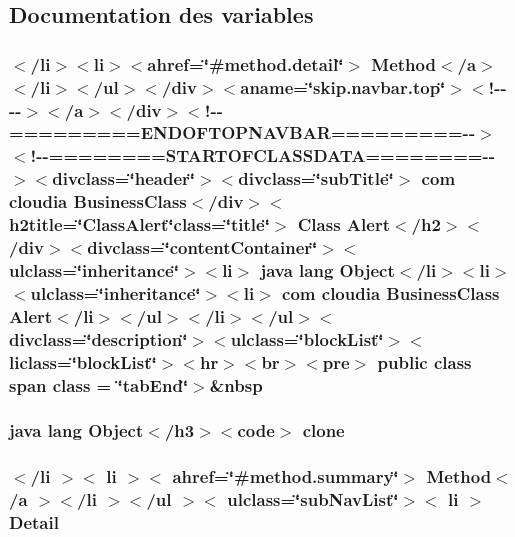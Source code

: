 \subsection{Documentation des variables}
\hypertarget{_alert_8html_a290c972cb9a60e397e66d2e329e3e475}{
\subsubsection[{class}]{\setlength{\rightskip}{0pt plus 5cm}$<$/li$>$$<$li$>$$<$ahref=\char`\"{}\#method.\-detail\char`\"{}$>$ Method$<$/{\bf a}$>$$<$/li$>$$<$/ul$>$$<$/div$>$$<$aname=\char`\"{}skip.\-navbar.\-top\char`\"{}$>$$<$!-\/-\/-\/-\/$>$$<$/a$>$$<$/div$>$$<$!-\/-\/=========E\-N\-D\-O\-F\-T\-O\-P\-N\-A\-V\-B\-A\-R=========-\/-\/$>$$<$!-\/-\/========S\-T\-A\-R\-T\-O\-F\-C\-L\-A\-S\-S\-D\-A\-T\-A========-\/-\/$>$$<$divclass=\char`\"{}header\char`\"{}$>$$<$divclass=\char`\"{}sub\-Title\char`\"{}$>$ com cloudia Business\-Class$<$/div$>$$<$h2title=\char`\"{}Class\-Alert\char`\"{}class=\char`\"{}title\char`\"{}$>$ Class {\bf Alert}$<$/h2$>$$<$/div$>$$<$divclass=\char`\"{}content\-Container\char`\"{}$>$$<$ulclass=\char`\"{}inheritance\char`\"{}$>$$<$li$>$ java lang Object$<$/li$>$$<$li$>$$<$ulclass=\char`\"{}inheritance\char`\"{}$>$$<$li$>$ com cloudia Business\-Class {\bf Alert}$<$/li$>$$<$/ul$>$$<$/li$>$$<$/ul$>$$<$divclass=\char`\"{}description\char`\"{}$>$$<$ulclass=\char`\"{}block\-List\char`\"{}$>$$<$liclass=\char`\"{}block\-List\char`\"{}$>$$<$hr$>$$<$br$>$$<$pre$>$ public class {\bf span} class = \char`\"{}tab\-End\char`\"{}$>$\&nbsp}}\label{_alert_8html_a290c972cb9a60e397e66d2e329e3e475}
\hypertarget{_alert_8html_adc9607fcabf6f2d7f401ad52015ef6e0}{
\subsubsection[{clone}]{\setlength{\rightskip}{0pt plus 5cm}java lang Object$<$/h3$>$$<$code$>$ clone}}\label{_alert_8html_adc9607fcabf6f2d7f401ad52015ef6e0}
\hypertarget{_alert_8html_aa01aa9a7e64a9f1aac58e251d8ce82ae}{
\subsubsection[{Detail}]{\setlength{\rightskip}{0pt plus 5cm}$<$/li $>$$<$ li $>$$<$ ahref=\char`\"{}\#method.\-summary\char`\"{}$>$ Method$<$/{\bf a} $>$$<$/li $>$$<$/ul $>$$<$ ulclass=\char`\"{}sub\-Nav\-List\char`\"{}$>$$<$ li $>$ Detail}}\label{_alert_8html_aa01aa9a7e64a9f1aac58e251d8ce82ae}
